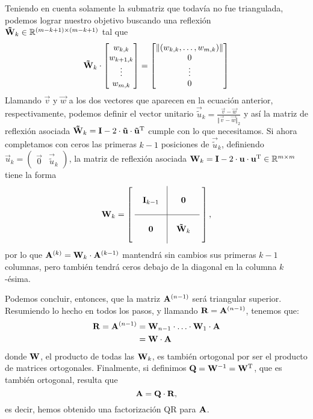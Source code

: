Teniendo en cuenta solamente la submatriz que todavía no fue triangulada,
podemos lograr nuestro objetivo buscando una reflexión $\mathbf{\tilde W}_k
\in \mathbb{R}^{(m-k+1) \times (m-k+1)} $ tal que
\[
\mathbf{\tilde W}_k \cdot
    \begin{bmatrix} w_{k,k} \\ w_{k+1,k} \\ \vdots \\ w_{m,k} \end{bmatrix}
=  \begin{bmatrix} \Vert (w_{k,k}, \dots, w_{m,k}) \Vert \\ 0 \\ \vdots \\ 0 \end{bmatrix}
\]
Llamando $\vec{v}$ y $\vec{w}$ a los dos vectores que aparecen en la ecuación
anterior, respectivamente, podemos definir el vector unitario
$\vec{\tilde u}_k = \frac{\vec{v} - \vec{w}}{\Vert \vec{v} - \vec{w} \Vert_2}$
y así la matriz de reflexión asociada $\mathbf{\tilde W}_k = \mathbf{I} - 2 \cdot
\mathbf{\tilde u} \cdot \mathbf{\tilde u}^{\mathrm{T}}$ cumple con lo que necesitamos.
Si ahora completamos con ceros las primeras $k-1$ posiciones de $\vec{\tilde u}_k$, definiendo $\vec{u}_k = ( \begin{array}{c|c} \vec{0} & \vec{\tilde u}_k \end{array} )$, la matriz de reflexión asociada $\mathbf{W}_k = \mathbf{I} - 2 \cdot
\mathbf{u} \cdot \mathbf{u}^{\mathrm{T}} \in \mathbb{R}^{m \times m}$ tiene la forma
\[
\mat{W}_k = \left[ \hspace{.1cm} \begin{array}{c|c}
    \matbox{.6cm}{1cm}{\mat{I}_{k-1}}
        & \matbox{.6cm}{1cm}{\mat{0}} \\ \hline
    \matbox{.6cm}{1cm}{\mat{0}}
        & \matbox{.6cm}{1cm}{\mat{\tilde W}_k}
\end{array} \hspace{.1cm} \right],
\]
por lo que $\mathbf{A}^{(k)} = \mathbf{W}_k \cdot \mathbf{A}^{(k-1)}$ mantendrá sin
cambios sus primeras $k-1$ columnas, pero también tendrá ceros debajo de la
diagonal en la columna $k$-ésima.

Podemos concluir, entonces, que la matriz $\mathbf{A}^{(n-1)}$ será triangular
superior. Resumiendo lo hecho en todos los pasos, y llamando
$\mathbf{R} = \mathbf{A}^{(n-1)}$, tenemos que:
\[ \begin{aligned}
    \mathbf{R} = \mathbf{A}^{(n-1)}
    &= \mathbf{W}_{n-1} \cdot \ldots \cdot \mathbf{W}_{1}
        \cdot \mathbf{A} \\
    &= \mathbf{W} \cdot \mathbf{A}
\end{aligned} \]
donde $\mathbf{W}$, el producto de todas las $\mathbf{W}_k$, es también ortogonal
por ser el producto de matrices ortogonales.
Finalmente, si definimos $\mathbf{Q} = \mathbf{W}^{-1} = \mathbf{W}^{\mathrm{T}}$, que es
también ortogonal, resulta que
\[ \mathbf{A} = \mathbf{Q} \cdot \mathbf{R}, \]
es decir, hemos obtenido una factorización QR para $\mathbf{A}$.

